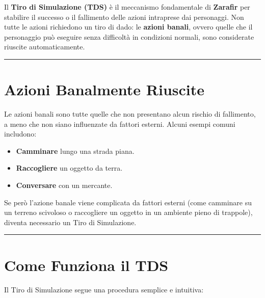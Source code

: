 \documentclass[../manuale_main.tex]{subfiles}
\begin{document}
Il \textbf{Tiro di Simulazione (TDS)} è il meccanismo fondamentale di \textbf{Zarafir} per stabilire il successo o il fallimento delle azioni intraprese dai personaggi. Non tutte le azioni richiedono un tiro di dado: le \textbf{azioni banali}, ovvero quelle che il personaggio può eseguire senza difficoltà in condizioni normali, sono considerate riuscite automaticamente.


\vspace{0.5cm}
\noindent
\begin{center}
\rule{\textwidth}{0.4pt} 
\end{center}
\vspace{0.5cm}

\section*{Azioni Banalmente Riuscite}
Le azioni banali sono tutte quelle che non presentano alcun rischio di fallimento, a meno che non siano influenzate da fattori esterni. Alcuni esempi comuni includono:

\begin{itemize}
 \item \textbf{Camminare} lungo una strada piana.
 \item \textbf{Raccogliere} un oggetto da terra.
 \item \textbf{Conversare} con un mercante.
\end{itemize}

Se però l'azione banale viene complicata da fattori esterni (come camminare su un terreno scivoloso o raccogliere un oggetto in un ambiente pieno di trappole), diventa necessario un Tiro di Simulazione.


\vspace{0.5cm}
\noindent
\begin{center}
\rule{\textwidth}{0.4pt} 
\end{center}
\vspace{0.5cm}

\section*{Come Funziona il TDS}
Il Tiro di Simulazione segue una procedura semplice e intuitiva:
\end{document}
